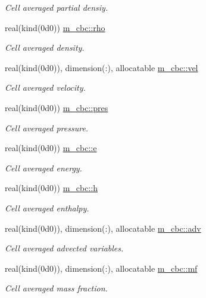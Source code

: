 \begin{DoxyCompactItemize}
\begin{DoxyCompactList}\small\item\em Cell averaged partial densiy. \end{DoxyCompactList}\item 
real(kind(0d0)) \hyperlink{namespacem__cbc_afece2e0a449e76d45bd85eeec0207ce8}{m\+\_\+cbc\+::rho}
\begin{DoxyCompactList}\small\item\em Cell averaged density. \end{DoxyCompactList}\item 
real(kind(0d0)), dimension(\+:), allocatable \hyperlink{namespacem__cbc_ad80b730485604931948331f36eb7b6e2}{m\+\_\+cbc\+::vel}
\begin{DoxyCompactList}\small\item\em Cell averaged velocity. \end{DoxyCompactList}\item 
real(kind(0d0)) \hyperlink{namespacem__cbc_ad6960b075aa8db0bcc08761273a6c4c3}{m\+\_\+cbc\+::pres}
\begin{DoxyCompactList}\small\item\em Cell averaged pressure. \end{DoxyCompactList}\item 
real(kind(0d0)) \hyperlink{namespacem__cbc_a4e9565add4d8b423cbcecb0da55e232c}{m\+\_\+cbc\+::e}
\begin{DoxyCompactList}\small\item\em Cell averaged energy. \end{DoxyCompactList}\item 
real(kind(0d0)) \hyperlink{namespacem__cbc_afef2a31e21e4f17b6852005a08ee86ce}{m\+\_\+cbc\+::h}
\begin{DoxyCompactList}\small\item\em Cell averaged enthalpy. \end{DoxyCompactList}\item 
real(kind(0d0)), dimension(\+:), allocatable \hyperlink{namespacem__cbc_af8d317b53da9384f50a1c51dd46bc8fe}{m\+\_\+cbc\+::adv}
\begin{DoxyCompactList}\small\item\em Cell averaged advected variables. \end{DoxyCompactList}\item 
real(kind(0d0)), dimension(\+:), allocatable \hyperlink{namespacem__cbc_a4f6b082aae7f83fcad04d8c5d59f6d89}{m\+\_\+cbc\+::mf}
\begin{DoxyCompactList}\small\item\em Cell averaged mass fraction. \end{DoxyCompactList}\item 

\end{DoxyCompactItemize}
